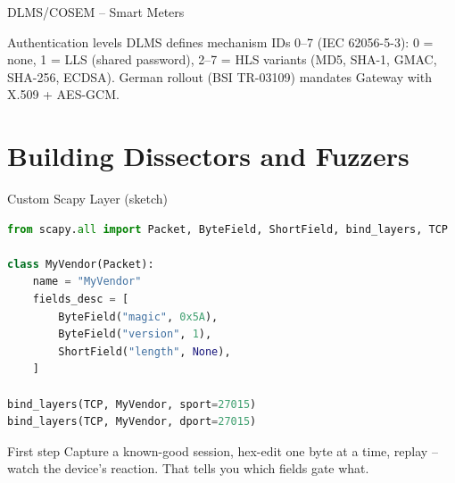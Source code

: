 \documentclass[aspectratio=169,11pt]{beamer}
\begin{document}
\begin{frame}{DLMS/COSEM -- Smart Meters}
\centering
{}
\vspace{2mm}
\begin{notebox}{Authentication levels}
DLMS defines mechanism IDs 0--7 (IEC 62056-5-3): 0 = none, 1 = LLS (shared password), 2--7 = HLS variants (MD5, SHA-1, GMAC, SHA-256, ECDSA). German rollout (BSI TR-03109) mandates Gateway with X.509 + AES-GCM.
\end{notebox}
\end{frame}

\section{Building Dissectors and Fuzzers}

\begin{frame}[fragile]{Custom Scapy Layer (sketch)}
\begin{lstlisting}[language=Python]
from scapy.all import Packet, ByteField, ShortField, bind_layers, TCP

class MyVendor(Packet):
    name = "MyVendor"
    fields_desc = [
        ByteField("magic", 0x5A),
        ByteField("version", 1),
        ShortField("length", None),
    ]

bind_layers(TCP, MyVendor, sport=27015)
bind_layers(TCP, MyVendor, dport=27015)
\end{lstlisting}
\vspace{2mm}
\begin{tipbox}{First step}
Capture a known-good session, hex-edit one byte at a time, replay -- watch the device's reaction. That tells you which fields gate what.
\end{tipbox}
\end{frame}
\end{document}
